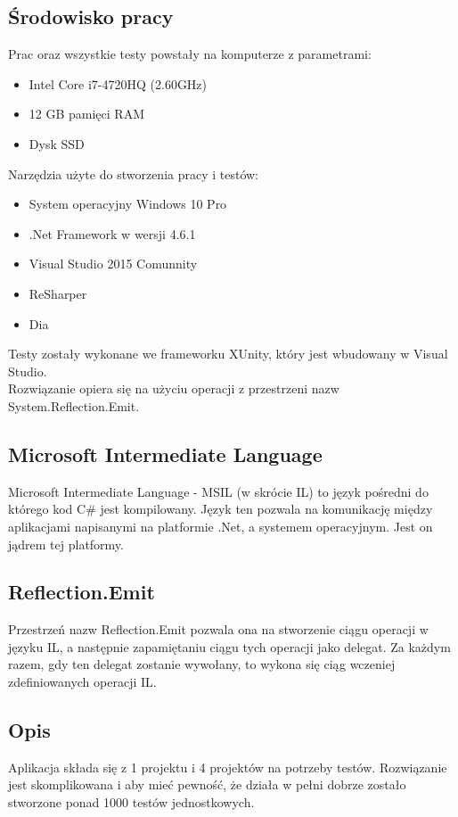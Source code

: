 \documentclass[12pt]{article}
\begin{document}
\subsection{Środowisko pracy}
Prac oraz wszystkie testy powstały na komputerze z parametrami:
\begin{itemize}
	\item Intel Core i7-4720HQ (2.60GHz)
	\item 12 GB pamięci RAM
	\item Dysk SSD
\end{itemize}
Narzędzia użyte do stworzenia pracy i testów:
\begin{itemize}
	\item {\color{red} System operacyjny Windows 10 Pro}
	\item .Net Framework w wersji 4.6.1
	\item Visual Studio 2015 Comunnity
	\item ReSharper
	\item Dia
\end{itemize}
Testy zostały wykonane we frameworku XUnity, który jest wbudowany w Visual Studio.\\
Rozwiązanie opiera się na użyciu operacji z przestrzeni nazw System.Reflection.Emit.

{\color{red}
\subsection{Microsoft Intermediate Language}
Microsoft Intermediate Language - MSIL (w skrócie IL) to język pośredni do którego kod C\# jest kompilowany. Język ten pozwala na komunikację między aplikacjami napisanymi na platformie .Net, a systemem operacyjnym. Jest on jądrem tej platformy.
}


{\color{red}
\subsection{Reflection.Emit}
Przestrzeń nazw Reflection.Emit pozwala ona na stworzenie ciągu operacji w języku IL, a następnie zapamiętaniu ciągu tych operacji jako delegat. Za każdym razem, gdy ten delegat zostanie wywołany, to wykona się ciąg wczeniej zdefiniowanych operacji IL.
}

\subsection{Opis}
Aplikacja składa się z 1 projektu i 4 projektów na potrzeby testów. Rozwiązanie jest skomplikowana i aby mieć pewność, że działa w pełni dobrze zostało stworzone {\color{red} ponad 1000} testów jednostkowych.\\
\end{document}
